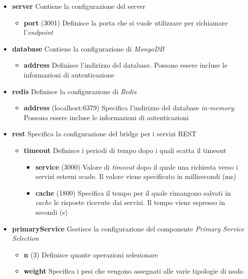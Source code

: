 \begin{itemize}
	\item \textbf{server}
	Contiene la configurazione del server
	\begin{itemize}
		\item \textbf{port}
		(3001) Definisce la porta che si vuole utilizzare per richiamare l'\emph{endpoint}
	\end{itemize}
	\item \textbf{database}
	Contiene la configurazione di \emph{MongoDB}
	\begin{itemize}
		\item \textbf{address}
		Definisce l'indirizzo del database. Possono essere incluse le informazioni di autenticazione
	\end{itemize}
	\item \textbf{redis}
	Definisce la configurazione di \emph{Redis}
	\begin{itemize}
		\item \textbf{address}
		(localhost:6379) Specifica l'indirizzo del database \emph{in-memory}. Possono essere incluse le informazioni di autenticazioni
	\end{itemize}
	\item \textbf{rest}
	Specifica la configurazione del bridge per i servizi REST
	\begin{itemize}
		\item \textbf{timeout}
		Definisce i periodi di tempo dopo i quali scatta il timeout
		\begin{itemize}
			\item \textbf{service}
			(3000) Valore di \emph{timeout} dopo il quale una richiesta verso i servizi esterni scade. Il valore viene specificato in millisecondi (ms)
			\item \textbf{cache}
			(1800) Specifica il tempo per il quale rimangono salvati in \emph{cache} le risposte ricevute dai servizi. Il tempo viene espresso in secondi (s)
		\end{itemize}
	\end{itemize}
	\item \textbf{primaryService}
	Gestisce la configurazione del componente \emph{Primary Service Selection}
	\begin{itemize}
		\item \textbf{n}
		(3) Definisce quante operazioni selezionare
		\item \textbf{weight}
		Specifica i pesi che vengono assegnati alle varie tipologie di nodo
		\begin{itemize}

\end{itemize}
\end{itemize}
\end{itemize}
